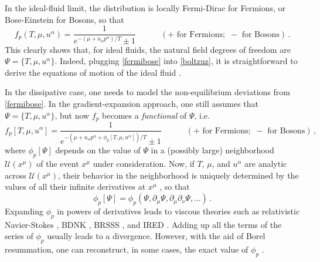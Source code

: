 \documentclass[a4paper, amsfonts, amssymb, amsmath, reprint, showkeys, nofootinbib, twoside, onecolumn, notitlepage]{revtex4-1}
\newcommand{\spc}{\quad \quad \quad}
\begin{document}
In the ideal-fluid limit, the distribution is locally Fermi-Dirac for Fermions, or Bose-Einstein for Bosons, so that
\begin{equation}\label{fermibose}
    f_p(T,\mu,u^\alpha)= \dfrac{1}{e^{-(\mu{+}u_\alpha p^\alpha)/T}{\pm} 1} \spc (+\text{ for Fermions}; \, \,-\text{ for Bosons}) \, .
\end{equation}
This clearly shows that, for ideal fluids, the natural field degrees of freedom are $\Psi=\{ T,\mu,u^\alpha \}$. Indeed, plugging \eqref{fermibose} into \eqref{boltzuz}, it is straightforward to derive the equations of motion of the ideal fluid \cite{huang_book}.

In the dissipative case, one needs to model the non-equilibrium deviations from \eqref{fermibose}. In the gradient-expansion approach, one still assumes that $\Psi=\{ T,\mu,u^\alpha \}$, but now $f_p$ becomes a \textit{functional} of $\Psi$, i.e.
\begin{equation}\label{fribuz}
    f_p[T,\mu,u^\alpha]= \dfrac{1}{e^{-(\mu{+}u_\alpha p^\alpha+\phi_p[T,\mu,u^\alpha])/T}{\pm} 1} \spc (+\text{ for Fermions}; \, \,-\text{ for Bosons}) \, ,    
\end{equation}
where $\phi_p[\Psi]$ depends on the value of $\Psi$ in a (possibly large) neighborhood $\mathcal{U}(x^\mu)$ of the event $x^\mu$ under consideration. Now, if $T$, $\mu$, and $u^\alpha$ are analytic across $\mathcal{U}(x^\mu)$, their behavior in the neighborhood is uniquely determined by the values of all their infinite derivatives at $x^\mu$ \cite{Rauch_book}, so that
\begin{equation}
    \phi_p[\Psi]=\phi_p(\Psi,\partial_\mu \Psi,\partial_\mu \partial_\nu \Psi,...) \, .
\end{equation}
Expanding $\phi_p$ in powers of derivatives leads to viscous theories such as relativistic Navier-Stokes \cite{Eckart40,landau6}, BDNK \cite{Bemfica2019_conformal1,BemficaDNDefinitivo2020,Kovtun2019}, BRSSS \cite{Baier2008}, and IRED \cite{Wagner:2022ayd}. Adding up all the terms of the series of $\phi_p$ usually leads to a divergence. However, with the aid of Borel resummation, one can reconstruct, in some cases, the exact value of $\phi_p$ \cite{Heller:2015dha,Heller:2016rtz,Romatsche2018,Spalinski2018}.
\end{document}
